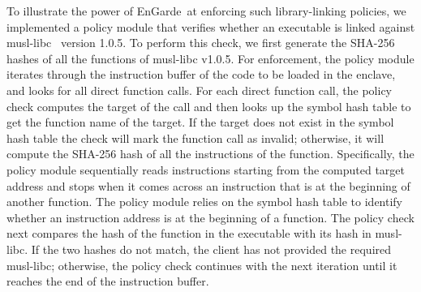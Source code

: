 \documentclass[conference,compsoc]{IEEEtran}
\newcommand{\tool}{EnGarde\xspace} %
\begin{document}
To illustrate the power of \tool\ at enforcing such library-linking policies,
we implemented a policy module that verifies whether an executable is linked
against musl-libc~\cite{musllibc} version 1.0.5. To perform this check, we
first generate the SHA-256 hashes of all the functions of musl-libc v1.0.5.
For enforcement, the policy module iterates through the instruction buffer of
the code to be loaded in the enclave, and looks for all direct function calls.
For each direct function call, the policy check computes the target of the call
and then looks up the symbol hash table to get the function name of the target.
If the target does not exist in the symbol hash table the check will mark the
function call as invalid; otherwise, it will compute the SHA-256 hash of all
the instructions of the function. Specifically, the policy module sequentially reads instructions starting from 
the computed target address and stops when it comes across an instruction that 
is at the beginning of another function. The policy module relies on the symbol hash
table to identify whether an instruction address is at the beginning of a function. The policy check next compares the hash of the
function in the executable with its hash in musl-libc. If the two hashes do not
match, the client has not provided the required musl-libc; otherwise, the
policy check continues with the next iteration until it reaches the end of the
instruction buffer.
\end{document}
